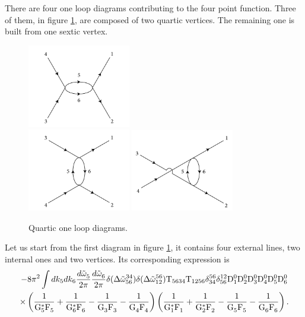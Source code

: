 There are four  one loop diagrams contributing to the four point function. Three of them, in figure \ref{fig:quarticoneloop}, are composed of two quartic vertices.
The remaining one is built from one sextic vertex.
\begin{figure}[ht]
    \centering
    \includegraphics[width=0.4\textwidth]{images/schanneloneloop.jpg}\\
    \includegraphics[width=0.4\textwidth]{images/tchanneloneloop.jpg}
    \includegraphics[width=0.4\textwidth]{images/uchanneloneloop.jpg}
    \caption{Quartic one loop diagrams.}
    \label{fig:quarticoneloop}
\end{figure} 
Let us start from the first diagram in figure \ref{fig:quarticoneloop}, it contains four external lines, two internal ones and two vertices. Its corresponding expression is
\begin{multline}
    -8\pi^2\int dk_5 dk_6\frac{d\tilde{\omega}^{}_5}{2\pi}\frac{d\tilde{\omega}^{}_6}{2\pi}\delta(\Delta{\tilde{\omega}}^{34}_{56})\delta(\Delta{\tilde{\omega}}^{56}_{12})\mathrm{T}_{5634}\mathrm{T}_{1256}\delta^{56}_{34}
    \delta^{12}_{56}\mathrm{D}_1^0\mathrm{D}_2^0\mathrm{D}_3^0\mathrm{D}_4^0\mathrm{D}_5^0\mathrm{D}_6^0 \\ 
    \times \left(\dfrac{1}{\mathrm{G}_5^*\mathrm{F}_5^{}}+\dfrac{1}{\mathrm{G}_6^*\mathrm{F}_6^{}}-\dfrac{1}{\mathrm{G}_3^{}\mathrm{F}_3^{}}
    -\dfrac{1}{\mathrm{G}_4^{}\mathrm{F}_4^{}}\right)\left(\dfrac{1}{\mathrm{G}_1^*\mathrm{F}_1^{}}+\dfrac{1}{\mathrm{G}_2^*\mathrm{F}_2^{}}-\dfrac{1}{\mathrm{G}_5^{}\mathrm{F}_5^{}}
    -\dfrac{1}{\mathrm{G}_6^{}\mathrm{F}_6^{}}\right).
    \label{schannel}
\end{multline}
